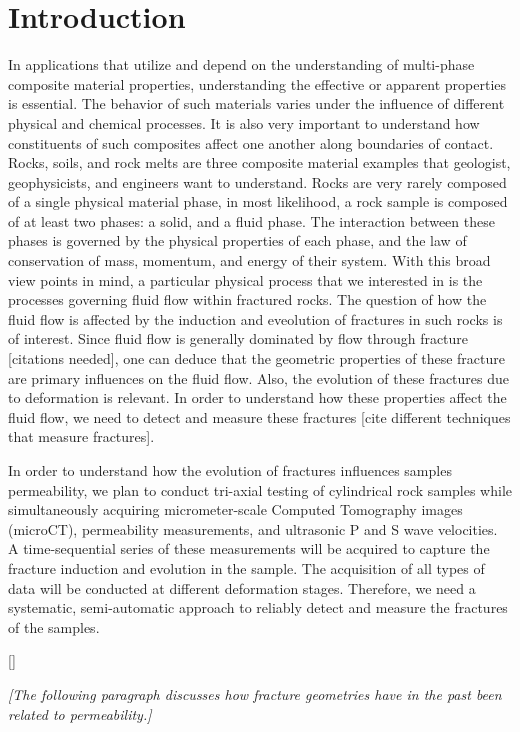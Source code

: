 \documentclass[usletter, 11pt, titlepage]{article}
\begin{document}
\section{Introduction}
In applications that utilize and depend on the understanding of multi-phase composite material properties, understanding the effective or apparent properties is essential. The behavior of such materials varies under the influence of different physical and chemical processes. It is also very important to understand how constituents of such composites affect one another along boundaries of contact. Rocks, soils, and rock melts are three composite material examples that geologist, geophysicists, and engineers want to understand. Rocks are very rarely composed of a single physical material phase, in most likelihood, a rock sample is composed of at least two phases: a solid, and a fluid phase. The interaction between these phases is governed by the physical properties of each phase, and the law of conservation of mass, momentum, and energy of their system. With this broad view points in mind, a particular physical process that we interested in is the processes governing fluid flow within fractured rocks. The question of how the fluid flow is affected by the induction and eveolution of fractures in such rocks is of interest. Since fluid flow is generally dominated by flow through fracture [citations needed], one can deduce that the geometric properties of these fracture are primary influences on the fluid flow. Also, the evolution of these fractures due to deformation is relevant. In order to understand how these properties affect the fluid flow, we need to detect and measure these fractures [cite different techniques that measure fractures].

In order to understand how the evolution of fractures influences samples permeability, we plan to conduct tri-axial testing of cylindrical rock samples while simultaneously acquiring micrometer-scale Computed Tomography images (microCT), permeability measurements, and ultrasonic P and S wave velocities. A time-sequential series of these measurements will be acquired to capture the fracture induction and evolution in the sample. The acquisition of all types of data will be conducted at different deformation stages. Therefore, we need a systematic, semi-automatic approach to reliably detect and measure the fractures of the samples. 

[]


\emph{[The following paragraph discusses how fracture geometries have in the past been related to permeability.]}
\end{document}
